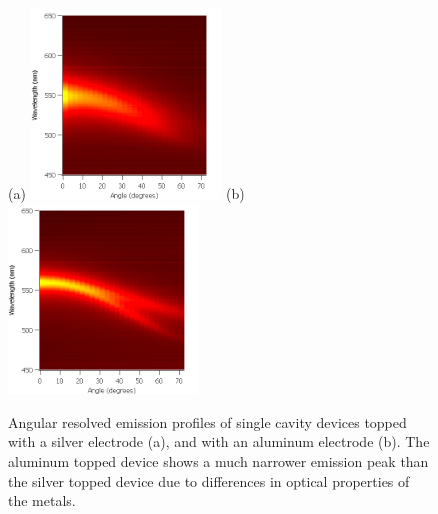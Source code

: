 \documentclass{report}
\begin{document}
        
        \begin{figure}[h!]
            \centering
            (a)
            \includegraphics[width=0.45\textwidth]{images/n1_ag_top_heatmap.png}
            (b)
            \includegraphics[width=0.45\textwidth]{images/n1_al_top_heatmap.png}
            \caption{\small Angular resolved emission profiles of single cavity devices topped with a silver electrode (a), and with an aluminum electrode (b). The aluminum topped device shows a much narrower emission peak than the silver topped device due to differences in optical properties of the metals.}
            \label{fig:topMaterial}
        \end{figure}
\end{document}
